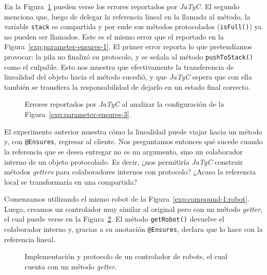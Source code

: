 En la Figura~\ref{exp:parameter-ensures-3:error} pueden verse los errores reportados por \textit{JaTyC}. El segundo menciona que, luego de delegar la referencia lineal en la llamada al método, la variable \texttt{stack} es compartida y por ende sus métodos protocolados (\texttt{isFull()}) ya no pueden ser llamados. Este es el mismo error que el reportado en la Figura~\ref{exp:parameter-ensures-1}. El primer error reporta lo que pretendíamos provocar: la pila no finalizó su protocolo, y se señala al método \texttt{pushToStack()} como el culpable. Esto nos muestra que efectivamente la transferencia de linealidad del objeto hacia el método sucedió, y que \textit{JaTyC} espera que con ella también se transfiera la responsabilidad de dejarlo en un estado final correcto.

\begin{figure}[htbp]
\centering

\caption{Errores reportados por \textit{JaTyC} al analizar la configuración de la Figura~\ref{exp:parameter-ensures-3}.}
\label{exp:parameter-ensures-3:error}
\end{figure}

El experimento anterior muestra cómo la linealidad puede viajar hacia un método y, con \texttt{@Ensures}, regresar al cliente. Nos preguntamos entonces qué sucede cuando la referencia que se desea entregar no es un argumento, sino un colaborador interno de un objeto protocolado. Es decir, ¿nos permitiría \textit{JaTyC} construir métodos \textit{getters} para colaboradores internos con protocolo? ¿Acaso la referencia local se transformaría en una compartida?

Comenzamos utilizando el mismo robot de la Figura~\ref{exp:compound-1:robot}. Luego, creamos un controlador muy similar al original pero con un método \textit{getter}, el cual puede verse en la Figura~\ref{exp:collaborator-compound-6:controller}. El método \texttt{getRobot()} devuelve el colaborador interno y, gracias a su anotación \texttt{@Ensures}, declara que lo hace con la referencia lineal.

\begin{figure}[htbp]
\centering

\vspace{0.3cm}

\caption{Implementación y protocolo de un controlador de robots, el cual cuenta con un método \textit{getter}.}
\label{exp:collaborator-compound-6:controller}
\end{figure}

